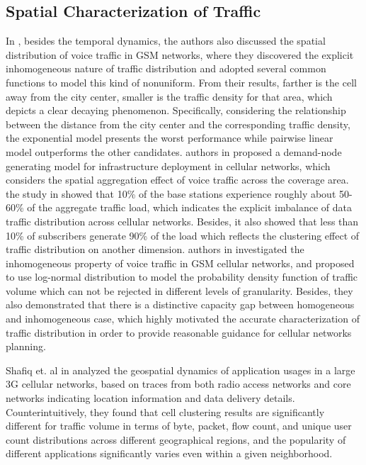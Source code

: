 {\subsection{Spatial Characterization of Traffic}
In \cite{almeida1999spatial}, besides the temporal dynamics, the authors also discussed the spatial distribution of voice traffic in GSM networks, where they discovered the explicit inhomogeneous nature of traffic distribution and adopted several common functions to model this kind of nonuniform. From their results, farther is the cell away from the city center, smaller is the traffic density for that area, which depicts a clear decaying phenomenon. Specifically, considering the relationship between the distance from the city center and the corresponding traffic density, the exponential model presents the worst performance while pairwise linear model outperforms the other candidates.
authors in \cite{tutschku1998spatial} proposed a demand-node generating model for infrastructure deployment in cellular networks, which considers the spatial aggregation effect of voice traffic across the coverage area.
the study in \cite{paul2011understanding} showed that 10\% of the base stations experience roughly about 50-60\% of the aggregate traffic load, which indicates the explicit imbalance of data traffic distribution across cellular networks. Besides, it also showed that less than 10\% of subscribers generate 90\% of the load which reflects the clustering effect of traffic distribution on another dimension.
authors in \cite{gotzner1998spatial} investigated the inhomogeneous property of voice traffic in GSM cellular networks, and proposed to use log-normal distribution to model the probability density function of traffic volume which can not be rejected in different levels of granularity. Besides, they also demonstrated that there is a distinctive capacity gap between homogeneous and inhomogeneous case, which highly motivated the accurate characterization of traffic distribution in order to provide reasonable guidance for cellular networks planning.

Shafiq et. al in \cite{shafiq2012characterizing} analyzed the geospatial dynamics of application usages in a large 3G cellular networks, based on traces from both radio access networks and core networks indicating location information and data delivery details. Counterintuitively, they found that cell clustering results are significantly different for traffic volume in terms of byte, packet, flow count, and unique user count distributions across different geographical regions, and the popularity of different applications significantly varies even within a given neighborhood.

}
